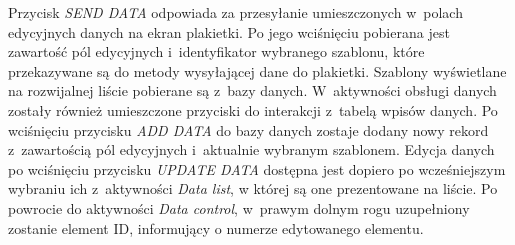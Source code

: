 \documentclass[a4paper,12pt, twoside]{article}
\begin{document}
\begin{enumerate}
\begin{figure}[H]
\begin{minipage}{.5\textwidth}
                    \label{fig:dataEdit}
                \end{minipage}
    	   \end{figure}
    	   Przycisk \textit{SEND DATA} odpowiada za przesyłanie umieszczonych w~polach edycyjnych danych na ekran plakietki. Po jego wciśnięciu pobierana jest zawartość pól edycyjnych i~identyfikator wybranego szablonu, które przekazywane są do metody wysyłającej dane do plakietki. Szablony wyświetlane na rozwijalnej liście pobierane są z~bazy danych. W~aktywności obsługi danych zostały również umieszczone przyciski do interakcji z~tabelą wpisów danych. Po wciśnięciu przycisku \textit{ADD DATA} do bazy danych zostaje dodany nowy rekord z~zawartością pól edycyjnych i~aktualnie wybranym szablonem. Edycja danych po wciśnięciu przycisku \textit{UPDATE DATA} dostępna jest dopiero po wcześniejszym wybraniu ich z~aktywności \textit{Data list}, w której są one prezentowane na liście. Po powrocie do aktywności \textit{Data control}, w~prawym dolnym rogu uzupełniony zostanie element ID, informujący o numerze edytowanego elementu.
    	   

\end{enumerate}
\end{document}
